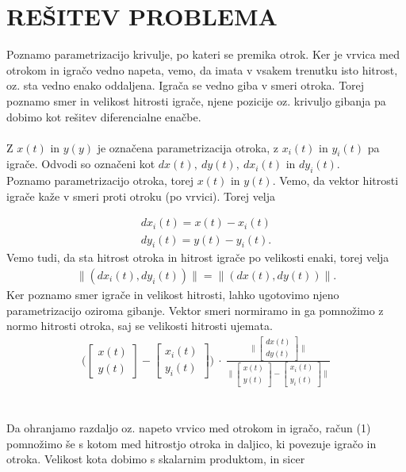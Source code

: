 \documentclass[a4paper,12pt]{article}
\begin{document}
\newpage
\section{\textsc{\large{REŠITEV PROBLEMA}}}

Poznamo parametrizacijo krivulje, po kateri se premika otrok. Ker je vrvica med otrokom in 
igračo vedno napeta, vemo, da imata v vsakem trenutku isto hitrost, oz. sta vedno enako 
oddaljena. Igrača se vedno giba v smeri otroka. 
Torej poznamo smer in velikost hitrosti igrače, njene pozicije oz. krivuljo gibanja pa 
dobimo kot rešitev diferencialne enačbe.
\\
\\
Z $x(t)$ in $y(y)$ je označena parametrizacija otroka, z $x_i(t)$ in $y_i(t)$ pa igrače. Odvodi so označeni kot $dx(t), \ dy(t), \ dx_i(t)$ in $dy_i(t)$. \\
Poznamo parametrizacijo otroka, torej $x(t)$ in $y(t)$. Vemo, da vektor hitrosti igrače kaže v smeri proti otroku (po vrvici).
Torej velja

\begin{align*}
    dx_i(t) = x(t) - x_i(t) \\
    dy_i(t) = y(t) - y_i(t).
\end{align*}
Vemo tudi, da sta hitrost otroka in hitrost igrače po velikosti enaki, torej velja
\begin{align*}
    \|(dx_i(t), dy_i(t))\| = \|(dx(t), dy(t))\|.
\end{align*}
Ker poznamo smer igrače in velikost hitrosti, lahko ugotovimo njeno parametrizacijo oziroma gibanje.
Vektor smeri normiramo in ga pomnožimo z normo hitrosti otroka, saj se velikosti hitrosti ujemata.
\\
\begin{align}
     \Big(
    \begin{bmatrix} 
        x(t) \\
        y(t)
    \end{bmatrix}
    -
    \begin{bmatrix} 
        x_i(t) \\
        y_i(t) 
    \end{bmatrix}
    \Big)
    \ \cdot \
    \frac{
    \Big \|
    \begin{bmatrix} 
        dx(t) \\
        dy(t)
    \end{bmatrix}
    \Big \|
    }
    {
    \Big \|
    \begin{bmatrix} 
        x(t) \\
        y(t)
    \end{bmatrix}
    -
    \begin{bmatrix} 
        x_i(t) \\
        y_i(t) 
    \end{bmatrix}
    \Big \|
    }
\end{align}
\\
\\
Da ohranjamo razdaljo oz. napeto vrvico med otrokom in igračo, račun (1) pomnožimo še 
s kotom med hitrostjo otroka in daljico, ki povezuje igračo in otroka. 
Velikost kota dobimo s skalarnim produktom, in sicer
\end{document}
